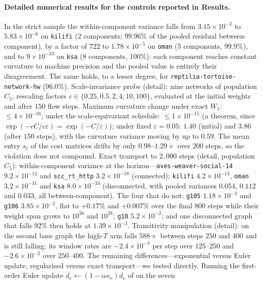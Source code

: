 \documentclass[11pt]{article}
\begin{document}
\paragraph{Detailed numerical results for the controls reported in
Results.} In the strict sample the within-component variance falls from
$3.15\times10^{-2}$ to $5.83\times10^{-6}$ on \texttt{kilifi} (2 components;
$99.96\%$ of the pooled residual between-component), by a factor of $722$ to
$1.78\times10^{-5}$ on \texttt{oman} (5 components, $99.9\%$), and to
$9\times10^{-33}$ on \texttt{ksa} (8 components, $100\%$): each component
reaches constant curvature to machine precision and the pooled value is
entirely their disagreement. The same holds, to a lesser degree, for
\texttt{reptilia-tortoise-network-hw} ($96.0\%$).
Scale-invariance probe (detail): nine networks of
population $C_5$, rescaling factors $c\in\{0.25,0.5,2,4,10,100\}$, evaluated
at the initial weights and after $150$ flow steps. Maximum curvature change
under exact $W_1$: $\le4\times10^{-16}$; under the scale-equivariant schedule:
$\le1\times10^{-15}$ (a theorem, since $\exp(-cC/c\varepsilon)=\exp(-C/\varepsilon)$);
under fixed $\varepsilon=0.05$: $1.40$ (initial) and $3.86$ (after $150$
steps), with the curvature variance moving by up to $0.59$. The mean entry
$s_t$ of the cost matrices drifts by only $0.98$--$1.29\times$ over $200$
steps, so the violation does not compound.
Exact transport to $2{,}000$ steps (detail, population
$C_5$): within-component variance at the horizon---\texttt{aves-weaver-social-14}
$9.2\times10^{-12}$ and \texttt{scc\_rt\_http} $3.2\times10^{-18}$
(connected); \texttt{kilifi} $4.2\times10^{-13}$, \texttt{oman}
$3.2\times10^{-31}$ and \texttt{ksa} $8.0\times10^{-33}$ (disconnected, with
pooled variances $0.054$, $0.112$ and $0.033$, all between-component). The
four that do not: \texttt{g105} $1.18\times10^{-2}$ and \texttt{g106}
$3.85\times10^{-2}$, flat to $+0.17\%$ and $+0.007\%$ over the final $800$
steps while their weight span grows to $10^{26}$ and $10^{28}$; \texttt{g10}
$5.2\times10^{-2}$; and one disconnected graph that falls $92\%$ then holds at
$1.39\times10^{-3}$.
Transitivity manipulation (detail): on the second base graph
the high-$T$ arm falls $588\times$ between steps $250$ and $400$ and is still
falling; its window rates are $-2.4\times10^{-3}$ per step over $125$--$250$
and $-2.6\times10^{-2}$ over $250$--$400$.
The remaining
differences---exponential versus Euler update, regularised versus exact
transport---we tested directly. Running the first-order Euler update
$d_e\leftarrow(1-\alpha\kappa_e)d_e$ of \cite{LiMunch2026} on the seven
\end{document}
